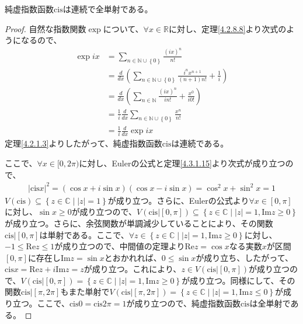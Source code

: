 \documentclass[dvipdfmx]{jsarticle}
\begin{document}
\begin{thm}\label{4.3.2.1} 純虚指数函数$\mathrm{cis}$は連続で全単射である。
\end{thm}
\begin{proof}
自然な指数関数$\exp$について、$\forall x \in \mathbb{R}$に対し、定理\ref{4.2.8.8}より次式のようになるので、
\begin{align*}
\exp{ix} &= \sum_{n \in \mathbb{N} \cup \left\{ 0 \right\}} \frac{(ix)^{n}}{n!}\\
&= \frac{d}{dx}\left( \sum_{n \in \mathbb{N} \cup \left\{ 0 \right\}} \frac{i^{n}x^{n + 1}}{(n + 1)n!} + \frac{1}{i} \right)\\
&= \frac{d}{dx}\left( \sum_{n \in \mathbb{N}} \frac{(ix)^{n}}{in!} + \frac{x^{0}}{i0!} \right)\\
&= \frac{1}{i}\frac{d}{dx}\sum_{n \in \mathbb{N} \cup \left\{ 0 \right\}} \frac{x^{n}}{n!}\\
&= \frac{1}{i}\frac{d}{dx}\exp{ix}
\end{align*}
定理\ref{4.2.1.3}よりしたがって、純虚指数函数$\mathrm{cis}$は連続である。\par
ここで、$\forall x \in [ 0,2\pi)$に対し、Eulerの公式と定理\ref{4.3.1.15}より次式が成り立つので、
\begin{align*}
\left| {\mathrm{cis}}x \right|^{2} = \left( \cos x + i\sin x \right)\left( \cos x - i\sin x \right) = \cos^{2}x + \sin^{2}x = 1
\end{align*}
$V(\mathrm{cis}) \subseteq \left\{ z \in \mathbb{C} \middle| |z| = 1 \right\}$が成り立つ。さらに、Eulerの公式より$\forall x \in [ 0,\pi]$に対し、$\sin x \geq 0$が成り立つので、$V\left( \mathrm{cis}|[ 0,\pi] \right) \subseteq \left\{ z \in \mathbb{C} \middle| |z| = 1,\mathrm{Im}z \geq 0 \right\}$が成り立つ。さらに、余弦関数が単調減少していることにより、その関数$\mathrm{cis}|[ 0,\pi]$は単射である。ここで、$\forall z \in \left\{ z \in \mathbb{C} \middle| |z| = 1,\mathrm{Im}z \geq 0 \right\}$に対し、$- 1 \leq \mathrm{Re}z \leq 1$が成り立つので、中間値の定理より$\mathrm{Re}z = \cos x$なる実数$x$が区間$[ 0,\pi]$に存在し$\mathrm{Im}z = \sin x$とおかれれば、$0 \leq \sin x$が成り立ち、したがって、${\mathrm{cis}}x = \mathrm{Re}z + i\mathrm{Im}z = z$が成り立つ。これにより、$z \in V\left( \mathrm{cis}|[ 0,\pi] \right)$が成り立つので、$V\left( \mathrm{cis}|[ 0,\pi] \right) = \left\{ z \in \mathbb{C} \middle| |z| = 1,\mathrm{Im}z \geq 0 \right\}$が成り立つ。同様にして、その関数$\mathrm{cis}|[\pi,2\pi]$もまた単射で$V\left( \mathrm{cis}|[\pi,2\pi] \right) = \left\{ z \in \mathbb{C} \middle| |z| = 1,\mathrm{Im}z \leq 0 \right\}$が成り立つ。ここで、${\mathrm{cis}}0 = {\mathrm{cis}}{2\pi} = 1$が成り立つので、純虚指数函数$\mathrm{cis}$は全単射である。
\end{proof}
\end{document}
